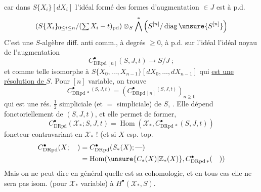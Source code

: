 car dans $S\{X_i\}[dX_i]$ l'idéal formé des formes  d'augmentation $\in J$ est à p.d.
\[
\left(S\{X_i\}_{0\leq i\leq n}/(\textstyle\sum X_i-t)_{\mathrm{pd}}\right)\otimes_S\bigwedge^*\left(S^{[n]}/\operatorname{diag}\unsure{S^{[n]}}\right)
\]
C'est une $S$-algèbre diff.  anti comm., à degrés $\geq0$,  à p.d. sur l'idéal  l'idéal noyau de l'augmentation
\[
C^\bullet_{\mathrm{DRpd}\,[n]}(S,J,t)\longrightarrow S/J\ ;
\]
et comme telle isomorphe à $S\{X_0,\ldots,X_{n-1}\}[dX_0,\ldots,dX_{n-1}]$ qui \uline{est une résolution de $S$}.
Pour $[n]$ variable, on trouve
\[
C^\bullet_{\mathrm{DRpd}\,*}{}^{(S,J,t)}=\left(C^\bullet_{\mathrm{DRpd}\,[n]}{}^{(S,J,t)}\right)_{n\geq0}
\]
qui est une rés. $\frac12$ simpliciale (et $=$ simpliciale) de $S$, . Elle dépend fonctoriellement de $(S,J,t)$, et elle permet de former, 
\[
C^\bullet_{\mathrm{DRpd}}(\mathcal X_*;S,J,t)=\operatorname{Hom}(\mathcal X_*,C^\bullet_{\mathrm{DRpd}\,*}(S,J,t))
\]
foncteur contravariant en $\mathcal X_*$ ! (et si $X$ esp. top.
\[
\begin{aligned}
C^\bullet_{\mathrm{DRpd}}(X;\quad)&=C^\bullet_{\mathrm{DRpd}}(S_*(X);\text{---})\\
&=\operatorname{Hom}(\unsure{C_*(X)|\mathbb Z_*(X)},C^\bullet_{\mathrm{DRpd}\,*}(\quad))
\end{aligned}
\]
Mais on ne peut dire en général quelle est sa cohomologie,  et en tous cas elle ne sera pas isom. (pour $\mathcal X_*$ variable) à $H^\bullet(\mathcal X_*,S)$.
